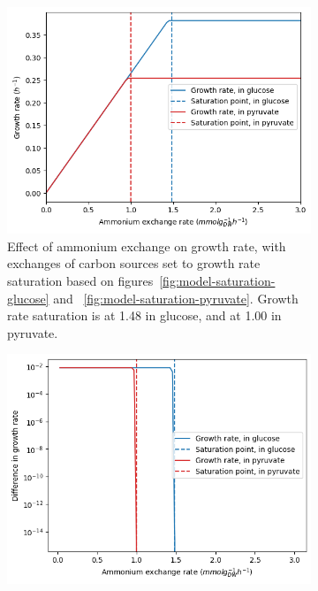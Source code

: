 \begin{figure}
  \begin{subfigure}[t]{0.45\textwidth}
  \centering
    \includegraphics[width=\linewidth]{saturation_amm}
    \caption{
      Effect of ammonium exchange on growth rate, with exchanges of carbon sources set to growth rate saturation based on figures~\ref{fig:model-saturation-glucose} and ~\ref{fig:model-saturation-pyruvate}.
      Growth rate saturation is at \SI{1.48}{\mmolgdwh} in glucose, and
      at \SI{1.00}{\mmolgdwh} in pyruvate.
    }
    \label{fig:model-saturation-ammonium}
  \end{subfigure}%
  \begin{subfigure}[t]{0.45\textwidth}
  \centering
    \includegraphics[width=\linewidth]{saturation_diff_amm}
    \caption{
    }
    \label{fig:model-saturation-diff-ammonium}
  \end{subfigure}


\end{figure}
